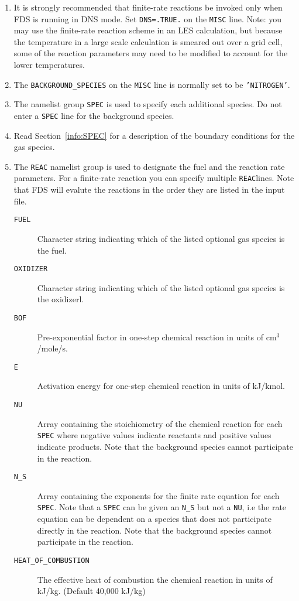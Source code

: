 \documentclass[11pt]{book}
\newcommand{\ct}{\tt\small}
\begin{document}
\begin{enumerate}
\item It is strongly recommended that finite-rate reactions be invoked only
when FDS is running in DNS mode. Set {\ct DNS=.TRUE.} on the {\ct MISC} line.
Note: you may use the finite-rate reaction scheme in an
LES calculation, but because the temperature in a large scale calculation
is smeared out over a grid cell, some of the reaction parameters may need
to be modified to account for the lower temperatures.

\item The {\ct BACKGROUND\_SPECIES} on the {\ct MISC} line is normally
set to be {\ct 'NITROGEN'}.

\item The namelist group {\ct SPEC} is used to specify each additional
species. Do not enter a {\ct SPEC} line for the background species.

\item Read Section~\ref{info:SPEC} for a description of the boundary
conditions for the gas species.

\item The {\ct REAC} namelist group is used to designate the fuel and the reaction rate
parameters.  For a finite-rate reaction you can specify multiple {\ct REAC}lines.  Note that
FDS will evalute the reactions in the order they are listed in the input file. %
\begin{description}
\item[{\ct FUEL}] Character string indicating which of the listed
optional gas species is the fuel.
\item[{\ct OXIDIZER}] Character string indicating which of the listed
optional gas species is the oxidizerl.
\item[{\ct BOF}] Pre-exponential factor in one-step chemical reaction in
units of cm$^3$/mole/s.
\item[{\ct E}] Activation energy for one-step chemical reaction in
units of kJ/kmol.
\item[{\ct NU}] Array containing the stoichiometry of the chemical reaction for each {\ct SPEC} where
negative values indicate reactants and positive values indicate products.  Note that the background species
cannot participate in the reaction.
\item[{\ct N\_S}] Array containing the exponents for the finite rate equation for each {\ct SPEC}.
Note that a {\ct SPEC} can be given an {\ct N\_S} but not a {\ct NU}, i.e the rate equation can
be dependent on a species that does not participate directly in the reaction.  Note that the background species
cannot participate in the reaction.
\item[{\ct HEAT\_OF\_COMBUSTION}] The effective heat of combustion the chemical reaction in units of kJ/kg. (Default 40,000 kJ/kg)
\end{description}

\end{enumerate}
\end{document}
